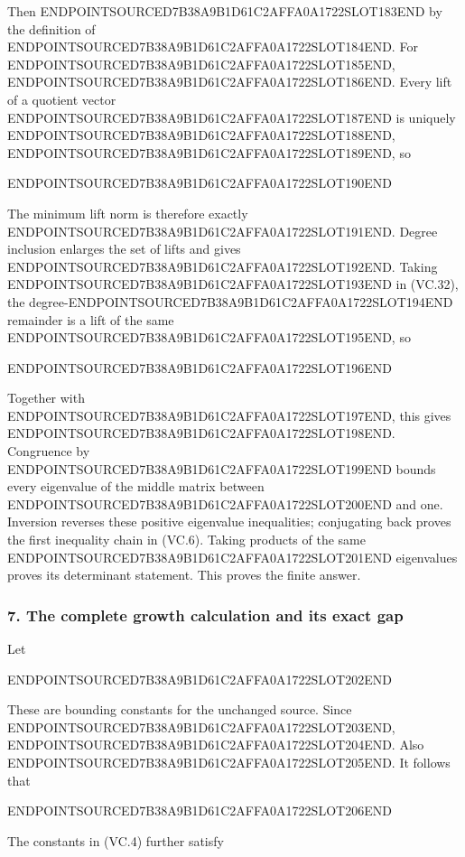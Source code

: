 Then ENDPOINTSOURCED7B38A9B1D61C2AFFA0A1722SLOT183END by the definition of ENDPOINTSOURCED7B38A9B1D61C2AFFA0A1722SLOT184END. For ENDPOINTSOURCED7B38A9B1D61C2AFFA0A1722SLOT185END, ENDPOINTSOURCED7B38A9B1D61C2AFFA0A1722SLOT186END. Every lift of a quotient vector ENDPOINTSOURCED7B38A9B1D61C2AFFA0A1722SLOT187END is uniquely ENDPOINTSOURCED7B38A9B1D61C2AFFA0A1722SLOT188END, ENDPOINTSOURCED7B38A9B1D61C2AFFA0A1722SLOT189END, so

ENDPOINTSOURCED7B38A9B1D61C2AFFA0A1722SLOT190END

The minimum lift norm is therefore exactly ENDPOINTSOURCED7B38A9B1D61C2AFFA0A1722SLOT191END. Degree inclusion enlarges the set of lifts and gives ENDPOINTSOURCED7B38A9B1D61C2AFFA0A1722SLOT192END. Taking ENDPOINTSOURCED7B38A9B1D61C2AFFA0A1722SLOT193END in (VC.32), the degree-ENDPOINTSOURCED7B38A9B1D61C2AFFA0A1722SLOT194END remainder is a lift of the same ENDPOINTSOURCED7B38A9B1D61C2AFFA0A1722SLOT195END, so

ENDPOINTSOURCED7B38A9B1D61C2AFFA0A1722SLOT196END

Together with ENDPOINTSOURCED7B38A9B1D61C2AFFA0A1722SLOT197END, this gives ENDPOINTSOURCED7B38A9B1D61C2AFFA0A1722SLOT198END. Congruence by ENDPOINTSOURCED7B38A9B1D61C2AFFA0A1722SLOT199END bounds every eigenvalue of the middle matrix between ENDPOINTSOURCED7B38A9B1D61C2AFFA0A1722SLOT200END and one. Inversion reverses these positive eigenvalue inequalities; conjugating back proves the first inequality chain in (VC.6). Taking products of the same ENDPOINTSOURCED7B38A9B1D61C2AFFA0A1722SLOT201END eigenvalues proves its determinant statement. This proves the finite answer.

\subsubsection{7. The complete growth calculation and its exact gap}\label{endpoint-volume_connection_original--the-complete-growth-calculation-and-its-exact-gap}

Let

ENDPOINTSOURCED7B38A9B1D61C2AFFA0A1722SLOT202END

These are bounding constants for the unchanged source. Since ENDPOINTSOURCED7B38A9B1D61C2AFFA0A1722SLOT203END, ENDPOINTSOURCED7B38A9B1D61C2AFFA0A1722SLOT204END. Also ENDPOINTSOURCED7B38A9B1D61C2AFFA0A1722SLOT205END. It follows that

ENDPOINTSOURCED7B38A9B1D61C2AFFA0A1722SLOT206END

The constants in (VC.4) further satisfy

